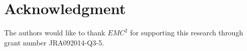 \documentclass{acm_proc_article-sp}
\begin{document}
\section*{Acknowledgment}
The authors would like to thank $EMC^2$ for supporting this research through grant number JRA092014-Q3-5.
%
%

\nocite{Zoha12articlenon-intrusive,CarrieArmel2013213,eps272990,NIPS2010,Rabiner,SS97a,Kawamoto,Diane,Klopfert,Ghahramani,Felice,Shen,taban,Albert,wijaya2014consumer,Zhang,achnata2012long,bassi,samuel,Falvo,Bakirtzis,Chen,Chow,DisaggregationHSMM,KolterJ12,KolterF11,BLTJ:BLTJ21650,Heinzelman00energy,Taylor,NYAS:NYAS5921,
Wijaya,5620917,1626400,mckerracher,hinton2000,aistats,fhmm,andrew}



%
%
\end{document}
